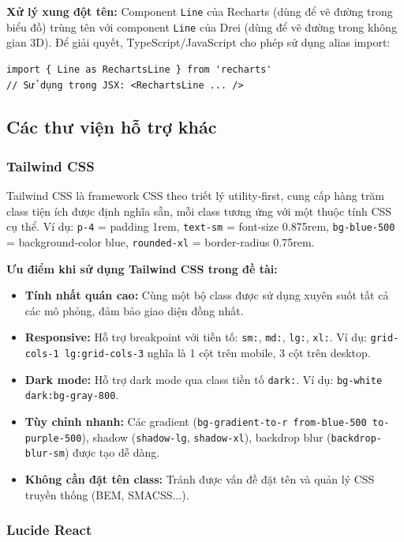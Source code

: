 \textbf{Xử lý xung đột tên:} Component \texttt{Line} của Recharts (dùng để vẽ đường trong biểu đồ) trùng tên với component \texttt{Line} của Drei (dùng để vẽ đường trong không gian 3D). Để giải quyết, TypeScript/JavaScript cho phép sử dụng alias import:

\begin{verbatim}
import { Line as RechartsLine } from 'recharts'
// Sử dụng trong JSX: <RechartsLine ... />
\end{verbatim}

\subsection{Các thư viện hỗ trợ khác}

\subsubsection{Tailwind CSS}

Tailwind CSS là framework CSS theo triết lý utility-first, cung cấp hàng trăm class tiện ích được định nghĩa sẵn, mỗi class tương ứng với một thuộc tính CSS cụ thể. Ví dụ: \texttt{p-4} = padding 1rem, \texttt{text-sm} = font-size 0.875rem, \texttt{bg-blue-500} = background-color blue, \texttt{rounded-xl} = border-radius 0.75rem.

\textbf{Ưu điểm khi sử dụng Tailwind CSS trong đề tài:}
\begin{itemize}
    \item \textbf{Tính nhất quán cao:} Cùng một bộ class được sử dụng xuyên suốt tất cả các mô phỏng, đảm bảo giao diện đồng nhất.
    \item \textbf{Responsive:} Hỗ trợ breakpoint với tiền tố: \texttt{sm:}, \texttt{md:}, \texttt{lg:}, \texttt{xl:}. Ví dụ: \texttt{grid-cols-1 lg:grid-cols-3} nghĩa là 1 cột trên mobile, 3 cột trên desktop.
    \item \textbf{Dark mode:} Hỗ trợ dark mode qua class tiền tố \texttt{dark:}. Ví dụ: \texttt{bg-white dark:bg-gray-800}.
    \item \textbf{Tùy chỉnh nhanh:} Các gradient (\texttt{bg-gradient-to-r from-blue-500 to-purple-500}), shadow (\texttt{shadow-lg}, \texttt{shadow-xl}), backdrop blur (\texttt{backdrop-blur-sm}) được tạo dễ dàng.
    \item \textbf{Không cần đặt tên class:} Tránh được vấn đề đặt tên và quản lý CSS truyền thống (BEM, SMACSS...).
\end{itemize}

\subsubsection{Lucide React}

